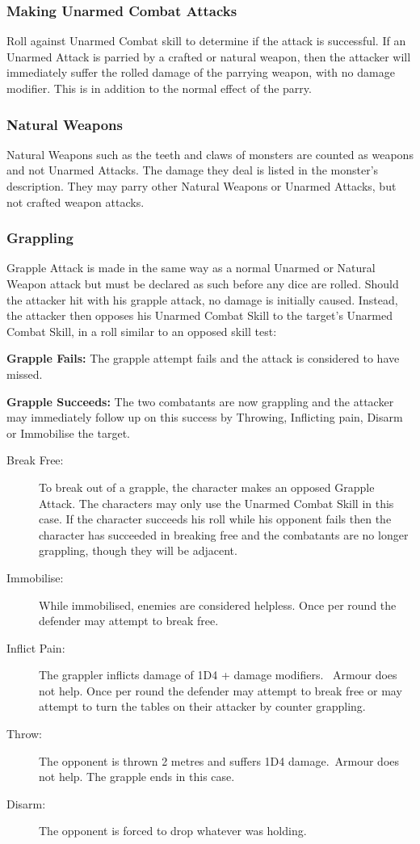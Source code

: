 \subsubsection{Making Unarmed Combat Attacks}
Roll against Unarmed Combat skill to determine if the attack is successful. If an Unarmed Attack is parried by a crafted or natural weapon, then the attacker will immediately suffer the rolled damage of the parrying weapon, with no damage modifier. This is in addition to the normal effect of the parry. 

\subsubsection{Natural Weapons}
Natural Weapons such as the teeth and claws of monsters are counted as weapons and not Unarmed Attacks. The damage they deal is listed in the monster’s description. They may parry other Natural Weapons or Unarmed Attacks, but not crafted weapon attacks.

\subsubsection{Grappling}
Grapple Attack is made in the same way as a normal Unarmed or Natural Weapon attack but must be declared as such before any dice are rolled. Should the attacker hit with his grapple attack, no damage is initially caused. Instead, the attacker then opposes his Unarmed Combat Skill to the target’s Unarmed Combat Skill, in a roll similar to an opposed skill test:
\begin{rpg-list}
\item \textbf{Grapple Fails:} The grapple attempt fails and the attack is considered to have missed. 
\item \textbf{Grapple Succeeds:} The two combatants are now grappling and the attacker may immediately follow up on this success by Throwing, Inflicting pain, Disarm or Immobilise the target.
\end{rpg-list}


\begin{description}
\item[Break Free:] To break out of a grapple, the character makes an opposed Grapple Attack. The characters may only use the Unarmed Combat Skill in this case. If the character succeeds his roll while his opponent fails then the character has succeeded in breaking free and the combatants are no longer grappling, though they will be adjacent.
\item[Immobilise:] While immobilised, enemies are considered helpless. Once per round the defender may attempt to break free.
\item[Inflict Pain:] The grappler inflicts damage of 1D4 + damage modifiers.  Armour does not help. Once per round the defender may attempt to break free or may attempt to turn the tables on their attacker by counter grappling.
\item[Throw:] The opponent is thrown 2 metres and suffers 1D4 damage. Armour does not help. The grapple ends in this case.
\item[Disarm:] The opponent is forced to drop whatever was holding.
\end{description}

